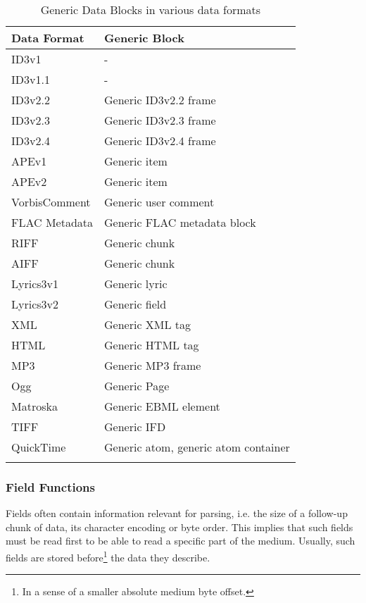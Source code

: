 \begin{longtable}{|p{}|p{}|}
	\hline
	Data Format & Generic Block\\
	\endhead
	\hline
	ID3v1 & \-- \\
	\hline
	ID3v1.1 & \-- \\
	\hline
	ID3v2.2 & Generic ID3v2.2 frame \\
	\hline
	ID3v2.3 & Generic ID3v2.3 frame \\
	\hline
	ID3v2.4 & Generic ID3v2.4 frame \\
	\hline
	APEv1 & Generic item \\
	\hline
	APEv2 & Generic item \\
	\hline
	VorbisComment & Generic user comment\\
	\hline
	FLAC Metadata & Generic FLAC metadata block \\
	\hline
	RIFF & Generic chunk\\
	\hline
	AIFF & Generic chunk\\
	\hline
	Lyrics3v1 & Generic lyric\\
	\hline
	Lyrics3v2 & Generic field\\
	\hline
	XML & Generic XML tag\\
	\hline
	HTML & Generic HTML tag\\
	\hline
	MP3 & Generic MP3 frame\\
	\hline
	Ogg & Generic Page \\
	\hline
	Matroska & Generic EBML element\\
	\hline
	TIFF & Generic IFD\\
	\hline
	QuickTime & Generic atom, generic atom container\\
	\hline
	\caption{Generic Data Blocks in various data formats}
	\label{tab:GExceptionsdefinedbythiscomponent}
\end{longtable}


\subsubsection{Field Functions}
\label{sec:FieldFunctions}

Fields often contain information relevant for parsing, i.e. the size of a follow-up chunk of data, its character encoding or byte order. This implies that such fields must be read first to be able to read a specific part of the medium. Usually, such fields are stored before\footnote{In a sense of a smaller absolute medium byte offset.} the data they describe.

